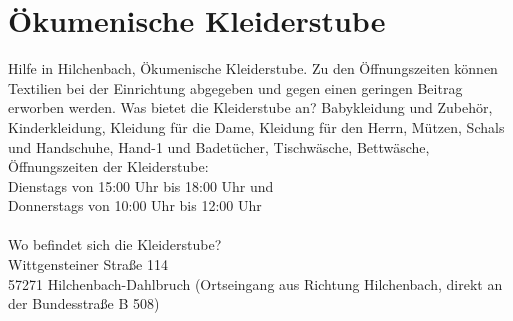 \section{Ökumenische Kleiderstube}
Hilfe in Hilchenbach, Ökumenische Kleiderstube. Zu den Öffnungszeiten können Textilien bei der Einrichtung abgegeben und gegen einen geringen Beitrag erworben werden. Was bietet die Kleiderstube an? Babykleidung und Zubehör, Kinderkleidung, Kleidung für die 
Dame, Kleidung für den Herrn, Mützen, Schals und Handschuhe, Hand-1 und Badetücher, Tischwäsche, Bettwäsche, Öffnungszeiten der Kleiderstube:\\
Dienstags von 15:00 Uhr bis 18:00 Uhr und \\
Donnerstags von 10:00 Uhr bis 12:00 Uhr \\
\\
Wo befindet sich die Kleiderstube? \\
Wittgensteiner Straße 114\\
57271 Hilchenbach-Dahlbruch (Ortseingang aus Richtung Hilchenbach, direkt an der Bundesstraße B 508)